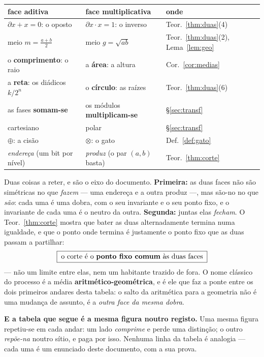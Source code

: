 \documentclass[11pt,a4paper]{article}
\begin{document}
\begin{center}\footnotesize
\begin{tabular}{@{}lll@{}}
\toprule
face \textbf{aditiva} & face \textbf{multiplicativa} & onde \\
\midrule
$\partial x+x=0$: o oposto & $\partial x\cdot x=1$: o inverso & Teor.~\ref{thm:duas}(4) \\
meio $m=\frac{a+b}{2}$ & meio $g=\sqrt{ab}$ & Teor.~\ref{thm:duas}(2), Lema~\ref{lem:geo} \\
o \textbf{comprimento}: o raio & a \textbf{área}: a altura & Cor.~\ref{cor:medias} \\
a \textbf{reta}: os diádicos $k/2^{n}$ & o \textbf{círculo}: as raízes & Teor.~\ref{thm:duas}(6) \\
as fases \textbf{somam-se} & os módulos \textbf{multiplicam-se} & §\ref{sec:transf} \\
cartesiano & polar & §\ref{sec:transf} \\
$\oplus$: a cisão & $\otimes$: o gato & Def.~\ref{def:gato} \\
\emph{endereça} (um bit por nível) & \emph{produz} (o par $(a,b)$ basta) & Teor.~\ref{thm:corte} \\
\bottomrule
\end{tabular}
\end{center}

\medskip\noindent Duas coisas a reter, e são o eixo do documento.
\textbf{Primeira:} as duas faces não são simétricas no que \emph{fazem} --- uma
endereça e a outra produz ---, mas são-no no que \emph{são}: cada uma é uma
dobra, com o seu invariante e o seu ponto fixo, e o invariante de cada uma é o
neutro da outra. \textbf{Segunda:} juntas elas \emph{fecham}. O
Teor.~\ref{thm:corte} mostra que bater as duas alternadamente termina numa
igualdade, e que o ponto onde termina é justamente o ponto fixo que as duas
passam a partilhar:
\[
\boxed{\;\text{o corte é o \textbf{ponto fixo comum} às duas faces}\;}
\]
--- não um limite entre elas, nem um habitante trazido de fora. O nome clássico
do processo é a média \textbf{aritmético-geométrica}, e é ele que faz a ponte
entre os dois primeiros andares desta tabela: o salto da aritmética para a
geometria não é uma mudança de assunto, é a \emph{outra face da mesma dobra}.

\medskip\noindent\textbf{E a tabela que segue é a mesma figura noutro registo.}
Uma mesma figura repetiu-se em cada andar: um lado \emph{comprime} e
perde uma distinção; o outro \emph{repõe-na} noutro sítio, e paga por isso.
Nenhuma linha da tabela é analogia --- cada uma é um enunciado deste documento,
com a sua prova.
\end{document}

